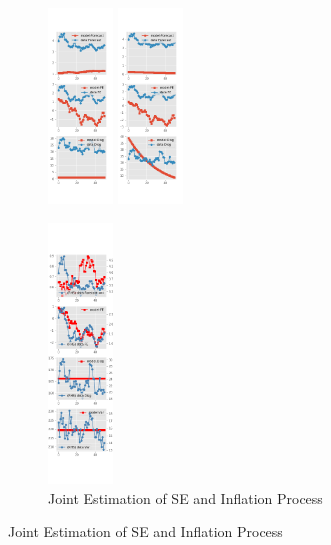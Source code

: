 \documentclass[]{article}
\begin{document}
\begin{figure}[ht]
\begin{subfigure}[b]{\textwidth}
		\includegraphics[width=0.19\textwidth]{figures/sce_ni_est_diag3.png}
		\includegraphics[width=0.19\textwidth]{figures/sce_ni_est_diag4.png}
	\end{subfigure}
	\vspace{1em}
	\vfill
	\begin{subfigure}[b]{\textwidth}
		\centering
		\caption{Joint Estimation of SE and Inflation Process}
		\label{NI_diag_joint_SCE}
		\includegraphics[width=0.19\textwidth]{figures/sce_ni_est_joint_diag0.png}

\end{subfigure}
\end{figure}
\end{document}
